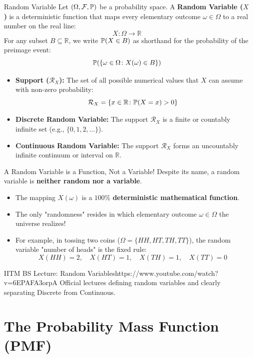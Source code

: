 \begin{definitionbox}{Random Variable}
Let $(\Omega, \mathcal{F}, \P)$ be a probability space. A \textbf{Random Variable ($X$)} is a deterministic function that maps every elementary outcome $\omega \in \Omega$ to a real number on the real line:
$$X \colon \Omega \to \mathbb{R}$$
For any subset $B \subseteq \mathbb{R}$, we write $\P(X \in B)$ as shorthand for the probability of the preimage event:
$$\P(\{\omega \in \Omega \colon X(\omega) \in B\})$$
\begin{itemize}
    \item \textbf{Support ($\mathcal{R}_X$):} The set of all possible numerical values that $X$ can assume with non-zero probability:
    $$\mathcal{R}_X = \{x \in \mathbb{R} \colon \P(X = x) > 0\}$$
    \item \textbf{Discrete Random Variable:} The support $\mathcal{R}_X$ is a finite or countably infinite set (e.g., $\{0, 1, 2, \dots\}$).
    \item \textbf{Continuous Random Variable:} The support $\mathcal{R}_X$ forms an uncountably infinite continuum or interval on $\mathbb{R}$.
\end{itemize}
\end{definitionbox}

\begin{intuitionbox}{A Random Variable is a Function, Not a Variable!}
Despite its name, a random variable is \textbf{neither random nor a variable}.
\begin{itemize}
    \item The mapping $X(\omega)$ is a $100\%$ \textbf{deterministic mathematical function}.
    \item The only "randomness" resides in which elementary outcome $\omega \in \Omega$ the universe realizes!
    \item For example, in tossing two coins ($\Omega = \{HH, HT, TH, TT\}$), the random variable "number of heads" is the fixed rule:
    $$X(HH) = 2, \quad X(HT) = 1, \quad X(TH) = 1, \quad X(TT) = 0$$
\end{itemize}
\end{intuitionbox}

\begin{videocard}{IITM BS Lecture: Random Variables}{https://www.youtube.com/watch?v=6EPAFA3orpA}
Official lectures defining random variables and clearly separating Discrete from Continuous.
\end{videocard}

\section{The Probability Mass Function (PMF)}

